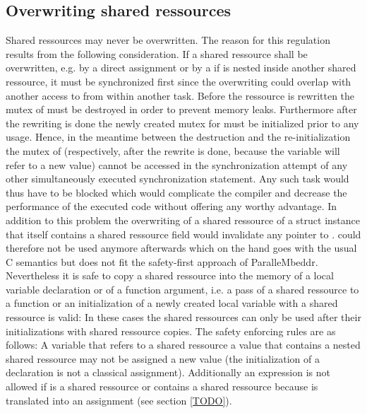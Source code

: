 \subsection{Overwriting shared ressources}
\label{overwritingSharedResources}
Shared ressources may never be overwritten. The reason for this regulation results from the following consideration. If a shared ressource  shall be overwritten, e.g. by a direct assignment or by a  if  is nested inside another shared ressource, it must be synchronized first since the overwriting could overlap with another access to  from within another task. Before the ressource is rewritten the mutex of  must be destroyed in order to prevent memory leaks. Furthermore after the rewriting is done the newly created mutex for  must be initialized prior to any usage. Hence, in the meantime between the destruction and the re-initialization the mutex of  (respectively,  after the rewrite is done, because the variable will refer to a new value) cannot be accessed in the synchronization attempt of any other simultaneously executed synchronization statement. Any such task would thus have to be blocked which would complicate the compiler and decrease the performance of the executed code without offering any worthy advantage. In addition to this problem the overwriting of a shared ressource of a struct instance that itself contains a shared ressource field  would invalidate any pointer  to .  could therefore not be used anymore afterwards which on the hand goes with the usual C semantics but does not fit the safety-first approach of ParalleMbeddr.
Nevertheless it is safe to copy a shared ressource into the memory of a local variable declaration or of a function argument, i.e. a pass of a shared ressource to a function or an initialization of a newly created local variable with a shared ressource is valid: In these cases the shared ressources can only be used after their initializations with shared ressource copies.
The safety enforcing rules are as follows: A variable that refers to a shared ressource a value that contains a nested shared ressource may not be assigned a new value (the initialization of a declaration is not a classical assignment). Additionally an expression  is not allowed if  is a shared ressource or contains a shared ressource because  is translated into an assignment (see section \ref{TODO}).